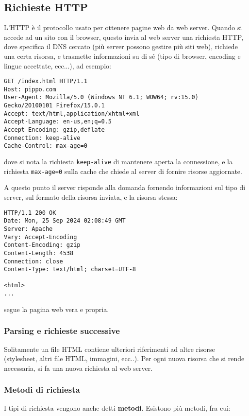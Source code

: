 \documentclass[a4paper,11pt]{article}
\begin{document}
\subsection{Richieste HTTP}
L'HTTP è il protocollo usato per ottenere pagine web da web server.
Quando si accede ad un sito con il browser, questo invia al web server una richiesta HTTP, dove specifica il DNS cercato (più server possono gestire più siti web), richiede una certa risorsa, e trasmette informazioni su di sé (tipo di browser, encoding e lingue accettate, ecc...), ad esempio:

\begin{lstlisting}[style=shellstyle]
GET /index.html HTTP/1.1
Host: pippo.com
User-Agent: Mozilla/5.0 (Windows NT 6.1; WOW64; rv:15.0) Gecko/20100101 Firefox/15.0.1
Accept: text/html,application/xhtml+xml
Accept-Language: en-us,en;q=0.5
Accept-Encoding: gzip,deflate
Connection: keep-alive
Cache-Control: max-age=0
\end{lstlisting}

dove si nota la richiesta \texttt{keep-alive} di mantenere aperta la connessione, e la richiesta \texttt{max-age=0} sulla cache che chiede al server di fornire risorse aggiornate. 

A questo punto il server risponde alla domanda fornendo informazioni sul tipo di server, sul formato della risorsa inviata, e la risorsa stessa:

\begin{lstlisting}[style=shellstyle]
HTTP/1.1 200 OK
Date: Mon, 25 Sep 2024 02:08:49 GMT
Server: Apache
Vary: Accept-Encoding
Content-Encoding: gzip
Content-Length: 4538
Connection: close
Content-Type: text/html; charset=UTF-8

<html>
...
\end{lstlisting}

segue la pagina web vera e propria.

\subsubsection{Parsing e richieste successive}
Solitamente un file HTML contiene ulteriori riferimenti ad altre risorse (stylesheet, altri file HTML, immagini, ecc..).
Per ogni nuova risorsa che si rende necessaria, si fa una nuova richiesta al web server.

\subsubsection{Metodi di richiesta}
I tipi di richiesta vengono anche detti \textbf{metodi}.
Esistono più metodi, fra cui:
\end{document}
